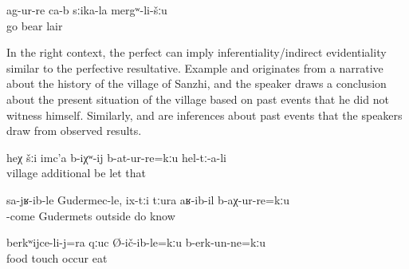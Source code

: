 \begin{exe}
	\ex	\label{ex:‎‎‎(Apparently,) they have gone to the cave of the bear}
	\gll	ag-ur-re	ca-b	sːika-la	mergʷ-li-šːu\\
		go		bear	lair\\
	\glt	{}
\end{exe}

In the right context, the perfect can imply inferentiality\slash indirect evidentiality similar to the perfective resultative. Example  and originates from a narrative about the history of the village of Sanzhi, and the speaker draws a conclusion about the present situation of the village based on past events that he did not witness himself. Similarly,  and  are inferences about past events that the speakers draw from observed results.


%
\begin{exe}
	\ex	\label{ex:‎(Apparently,) they have not allowed the village to grow}
	\gll	heχ	šːi	imc'a	b-iχʷ-ij	b-at-ur-re=kːu	hel-tː-a-li\\
			village	additional	be	let	that\\
	\glt	{}

	\ex	\label{ex:‎(Apparently,) when he came to Gudermets he did not know that they had been thrown out (of the village)}
	\gll	sa-jʁ-ib-le	Gudermec-le,		ix-tːi	tːura	aʁ-ib-il	b-aχ-ur-re=kːu\\
		-come	Gudermets		outside	do	know\\
	\glt	{}

	\ex	\label{ex:‎‎(Apparently,) he also has not touched the food, he has not eaten}
	\gll	berkʷijce-li-j=ra	qːuc	Ø-ič-ib-le=kːu		b-erk-un-ne=kːu\\
		food	touch	occur	eat\\
	\glt	{}
\end{exe}

